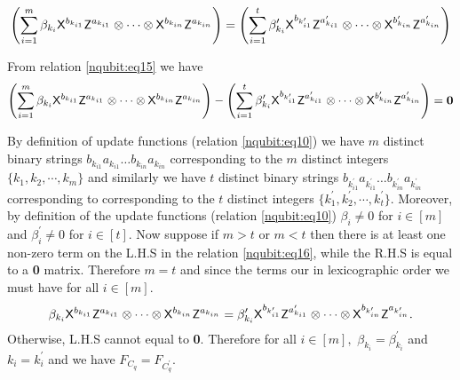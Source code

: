 \begin{equation}
\label{nqubit:eq15}
\begin{aligned}
\left(\sum_{i=1}^m \beta_{k_i} {\sf X}^{b_{k_{i1}}} {\sf Z}^{a_{k_{i1}}} \otimes \cdots  \otimes {\sf X}^{b_{k_{in}}} {\sf Z}^{a_{k_{in}}}\right)=\left(\sum_{i=1}^t \beta_{k_i}^\prime {\sf X}^{b_{k_{i1}^\prime}} {\sf Z}^{a_{k_{i1}}^\prime} \otimes \cdots  \otimes {\sf X}^{b_{k_{in}}^\prime} {\sf Z}^{a_{k_{in}}^\prime}\right)
\end{aligned}
\end{equation}

From relation \ref{nqubit:eq15} we have
\begin{equation}
\label{nqubit:eq16}
\begin{aligned}
\left(\sum_{i=1}^m \beta_{k_i} {\sf X}^{b_{k_{i1}}} {\sf Z}^{a_{k_{i1}}} \otimes \cdots  \otimes {\sf X}^{b_{k_{in}}} {\sf Z}^{a_{k_{in}}}\right)-\left(\sum_{i=1}^t \beta_{k_i}^\prime {\sf X}^{b_{k_{i1}^\prime}} {\sf Z}^{a_{k_{i1}}^\prime} \otimes \cdots  \otimes {\sf X}^{b_{k_{in}}^\prime} {\sf Z}^{a_{k_{in}}^\prime}\right)={\bf 0}
\end{aligned}
\end{equation}

By definition of update functions (relation \ref{nqubit:eq10}) we have $m$ distinct binary strings $b_{k_{i1}} a_{k_{i1}}\ldots b_{k_{in}} a_{k_{in}}$ corresponding to the $m$ distinct integers $\{k_1,k_2,\cdots, k_m\}$ and similarly we have $t$ distinct binary strings $b_{k_{i1}^\prime} a_{k_{i1}^\prime}\ldots b_{k_{in}^\prime} a_{k_{in}^\prime}$ corresponding to corresponding to the $t$ distinct integers $\{k_1^\prime,k_2^\prime,\cdots, k_t^\prime\}.$  Moreover, by definition of the update functions (relation \ref{nqubit:eq10}) $\beta_i\neq 0$ for $i\in [m]$ and $\beta_i^\prime\neq 0$  for $i\in [t].$ Now suppose if  $m>t$ or $m<t$ then there is at least one non-zero term on the L.H.S
in the relation \ref{nqubit:eq16}, while the R.H.S is equal to a {\bf 0} matrix. Therefore $m=t$ and since the terms our in  lexicographic order we must have for all $i\in[m].$
\begin{equation}
\label{nqubit:eq17}
 \beta_{k_i}{\sf X}^{b_{k_{i1}}} {\sf Z}^{a_{k_{i1}}} \otimes \cdots  \otimes {\sf X}^{b_{k_{in}}} {\sf Z}^{a_{k_{in}}}=\beta_{k_i}^\prime{\sf X}^{b_{k_{i1}^\prime}} {\sf Z}^{a_{k_{i1}}^\prime} \otimes \cdots  \otimes {\sf X}^{b_{k_{in}^\prime}} {\sf Z}^{a_{k_{in}^\prime}}.
\end{equation}
 Otherwise, L.H.S cannot equal to {\bf 0}. Therefore for all $i\in[m],$  $\beta_{k_i}=\beta_{k_i}^\prime$ and $k_i=k_i^\prime$ and we have $F_{C_q}=F_{C_q^\prime}.$

